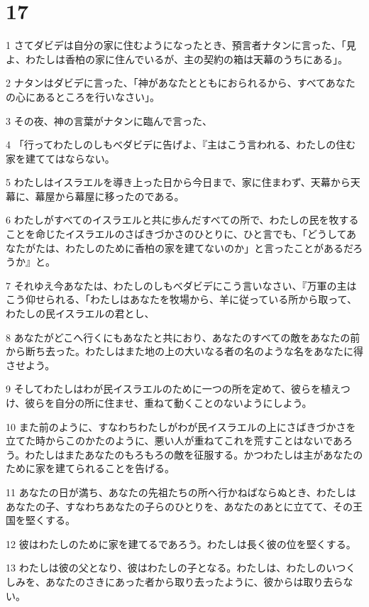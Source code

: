 \chapter{17}

\par 1 さてダビデは自分の家に住むようになったとき、預言者ナタンに言った、「見よ、わたしは香柏の家に住んでいるが、主の契約の箱は天幕のうちにある」。
\par 2 ナタンはダビデに言った、「神があなたとともにおられるから、すべてあなたの心にあるところを行いなさい」。
\par 3 その夜、神の言葉がナタンに臨んで言った、
\par 4 「行ってわたしのしもべダビデに告げよ、『主はこう言われる、わたしの住む家を建ててはならない。
\par 5 わたしはイスラエルを導き上った日から今日まで、家に住まわず、天幕から天幕に、幕屋から幕屋に移ったのである。
\par 6 わたしがすべてのイスラエルと共に歩んだすべての所で、わたしの民を牧することを命じたイスラエルのさばきづかさのひとりに、ひと言でも、「どうしてあなたがたは、わたしのために香柏の家を建てないのか」と言ったことがあるだろうか』と。
\par 7 それゆえ今あなたは、わたしのしもべダビデにこう言いなさい、『万軍の主はこう仰せられる、「わたしはあなたを牧場から、羊に従っている所から取って、わたしの民イスラエルの君とし、
\par 8 あなたがどこへ行くにもあなたと共におり、あなたのすべての敵をあなたの前から断ち去った。わたしはまた地の上の大いなる者の名のような名をあなたに得させよう。
\par 9 そしてわたしはわが民イスラエルのために一つの所を定めて、彼らを植えつけ、彼らを自分の所に住ませ、重ねて動くことのないようにしよう。
\par 10 また前のように、すなわちわたしがわが民イスラエルの上にさばきづかさを立てた時からこのかたのように、悪い人が重ねてこれを荒すことはないであろう。わたしはまたあなたのもろもろの敵を征服する。かつわたしは主があなたのために家を建てられることを告げる。
\par 11 あなたの日が満ち、あなたの先祖たちの所へ行かねばならぬとき、わたしはあなたの子、すなわちあなたの子らのひとりを、あなたのあとに立てて、その王国を堅くする。
\par 12 彼はわたしのために家を建てるであろう。わたしは長く彼の位を堅くする。
\par 13 わたしは彼の父となり、彼はわたしの子となる。わたしは、わたしのいつくしみを、あなたのさきにあった者から取り去ったように、彼からは取り去らない。
